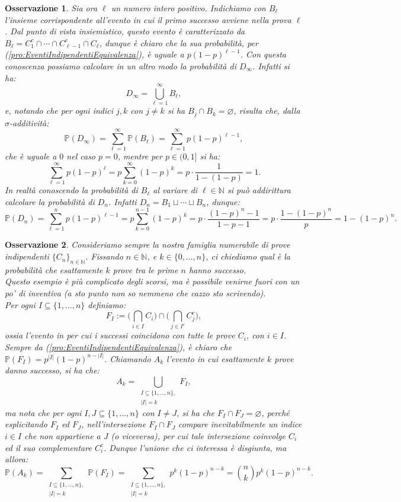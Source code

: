 \documentclass[11pt]{book}
\theoremstyle{Definizione}
\theoremstyle{TeoremaProposizioneLemmaCorollario}
\theoremstyle{OsservazioneNota}
\newtheorem{myobs}{Osservazione}[section]
\newcommand{\N}{\mathbb{N}}
\renewcommand{\P}{\mathbb{P}}
\begin{document}
\begin{myobs}
Sia ora $\ell$ un numero intero positivo. Indichiamo con $B_\ell$ l'insieme corrispondente all'evento in cui il primo successo avviene nella prova $\ell$. Dal punto di vista insiemistico, questo evento è caratterizzato da $B_\ell = C_1^c \cap \cdots \cap C_{\ell-1}^c \cap C_\ell$, dunque è chiaro che la sua probabilità, per (\ref{pro:EventiIndipendentiEquivalenza}), è uguale a $p(1-p)^{\ell-1}$. Con questa conoscenza possiamo calcolare in un altro modo la probabilità di $D_\infty$. Infatti si ha:
$$
D_\infty = \bigcup_{\ell = 1}^\infty B_\ell,
$$
e, notando che per ogni indici $j,k$ con $j\neq k$ si ha $B_j \cap B_k = \varnothing$, risulta che, dalla $\sigma$-additività:
$$
\P(D_\infty) = \sum_{\ell = 1}^\infty \P(B_\ell) = \sum_{\ell = 1}^\infty p(1-p)^{\ell-1},
$$
che è uguale a $0$ nel caso $p = 0$, mentre per $p\in (0,1]$ si ha:
$$
\sum_{\ell = 1}^\infty p(1-p)^\ell = p \sum_{k = 0}^\infty (1-p)^k = p\cdot \frac{1}{1-(1-p)} = 1.
$$
In realtà conoscendo la probabilità di $B_\ell$ al variare di $\ell\in \N$ si può addirittura calcolare la probabilità di $D_n$. Infatti $D_n = B_1 \sqcup \cdots \sqcup B_n$, dunque:
$$
\P(D_n) = \sum_{\ell = 1}^n p(1-p)^{\ell-1} = p \sum_{k = 0}^{n-1} (1-p)^{k} = p\cdot \frac{(1-p)^{n}-1}{1-p-1} = p \cdot \frac{1-(1-p)^{n}}{p} = 1-(1-p)^n.
$$
\end{myobs}
\begin{myobs}
Consideriamo sempre la nostra famiglia numerabile di prove indipendenti $\{C_n\}_{n\in \N}$. Fissando $n\in \N$, e $k\in \{0,\dots,n\}$, ci chiediamo qual è la probabilità che esattamente $k$ prove tra le prime $n$ hanno successo.\\
Questo esempio è più complicato degli scorsi, ma è possibile venirne fuori con un po' di inventiva (a sto punto non so nemmeno che cazzo sto scrivendo).\\
Per ogni $I \subseteq \{1,\dots,n\}$ definiamo:
$$
F_I := \Bigg(\bigcap_{i\in I} C_i\Bigg) \cap\Bigg(\bigcap_{j\in I^c} C_j^c\Bigg),
$$
ossia l'evento in per cui i successi coincidono con tutte le prove $C_i$, con $i\in I$. Sempre da (\ref{pro:EventiIndipendentiEquivalenza}), è chiaro che $
\P(F_I) = p^{|I|}(1-p)^{n-|I|}$. Chiamando $A_k$ l'evento in cui esattamente $k$ prove danno successo, si ha che:
$$
A_k = \bigcup_{\substack{ I \subseteq \{1,\dots,n\},\\ |I| = k}} F_I,
$$
ma nota che per ogni $I,J\subseteq \{1,\dots,n\}$ con $I\neq J$, si ha che $F_I\cap F_J = \varnothing$, perché esplicitando $F_I$ ed $F_J$, nell'intersezione $F_I\cap F_J$ compare inevitabilmente un indice $i\in I$ che non appartiene a $J$ (o viceversa), per cui tale intersezione coinvolge $C_i$ ed il suo complementare $C_i^c$. Dunque l'unione che ci interessa è disgiunta, ma allora:
$$
\P(A_k) = \sum_{\substack{I\subseteq \{1,\dots,n\},\\ |I| = k}} \P(F_I) = \sum_{\substack{I\subseteq \{1,\dots,n\},\\ |I| = k}} p^k(1-p)^{n-k} = \binom{n}{k}p^k(1-p)^{n-k}.
$$
\end{myobs}
\end{document}
